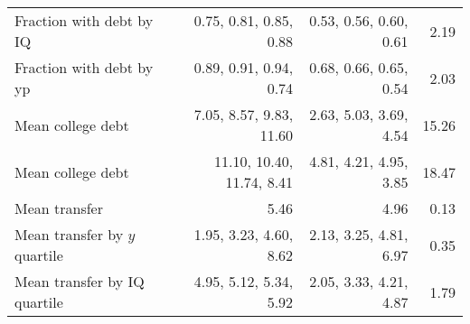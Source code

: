 \begin{tabular}{lrrr}
Fraction with debt by IQ & 0.75, 0.81, 0.85, 0.88  & 0.53, 0.56, 0.60, 0.61  & 2.19  \\ 
Fraction with debt by yp & 0.89, 0.91, 0.94, 0.74  & 0.68, 0.66, 0.65, 0.54  & 2.03  \\ 
Mean college debt & 7.05, 8.57, 9.83, 11.60  & 2.63, 5.03, 3.69, 4.54  & 15.26  \\ 
Mean college debt & 11.10, 10.40, 11.74, 8.41  & 4.81, 4.21, 4.95, 3.85  & 18.47  \\ 
Mean transfer & 5.46  & 4.96  & 0.13  \\ 
Mean transfer by $y$ quartile & 1.95, 3.23, 4.60, 8.62  & 2.13, 3.25, 4.81, 6.97  & 0.35  \\ 
Mean transfer by IQ quartile & 4.95, 5.12, 5.34, 5.92  & 2.05, 3.33, 4.21, 4.87  & 1.79  \\ 
\hline
\end{tabular}%
